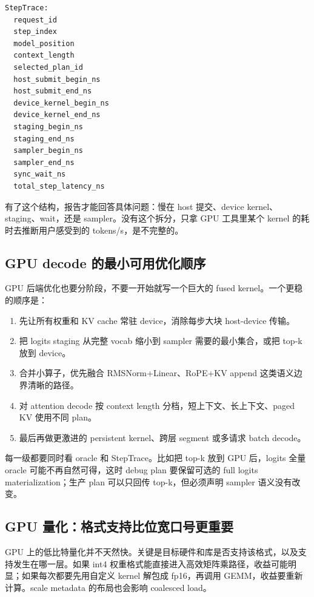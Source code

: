 \begin{lstlisting}[numbers=none,caption={StepTrace 应记录的字段}]
StepTrace:
  request_id
  step_index
  model_position
  context_length
  selected_plan_id
  host_submit_begin_ns
  host_submit_end_ns
  device_kernel_begin_ns
  device_kernel_end_ns
  staging_begin_ns
  staging_end_ns
  sampler_begin_ns
  sampler_end_ns
  sync_wait_ns
  total_step_latency_ns
\end{lstlisting}

有了这个结构，报告才能回答具体问题：慢在 host 提交、device kernel、staging、wait，还是 sampler。没有这个拆分，只拿 GPU 工具里某个 kernel 的耗时去推断用户感受到的 tokens/s，是不完整的。

\subsection{GPU decode 的最小可用优化顺序}

GPU 后端优化也要分阶段，不要一开始就写一个巨大的 fused kernel。一个更稳的顺序是：

\begin{enumerate}
  \item 先让所有权重和 KV cache 常驻 device，消除每步大块 host-device 传输。
  \item 把 logits staging 从完整 vocab 缩小到 sampler 需要的最小集合，或把 top-k 放到 device。
  \item 合并小算子，优先融合 RMSNorm+Linear、RoPE+KV append 这类语义边界清晰的路径。
  \item 对 attention decode 按 context length 分档，短上下文、长上下文、paged KV 使用不同 plan。
  \item 最后再做更激进的 persistent kernel、跨层 segment 或多请求 batch decode。
\end{enumerate}

每一级都要同时看 oracle 和 StepTrace。比如把 top-k 放到 GPU 后，logits 全量 oracle 可能不再自然可得，这时 debug plan 要保留可选的 full logits materialization；生产 plan 可以只回传 top-k，但必须声明 sampler 语义没有改变。

\subsection{GPU 量化：格式支持比位宽口号更重要}

GPU 上的低比特量化并不天然快。关键是目标硬件和库是否支持该格式，以及支持发生在哪一层。如果 int4 权重格式能直接进入高效矩阵乘路径，收益可能明显；如果每次都要先用自定义 kernel 解包成 fp16，再调用 GEMM，收益要重新计算。scale metadata 的布局也会影响 coalesced load。

